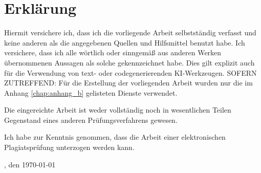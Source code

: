 \section*{Erklärung}
\vspace*{0.5cm}
\noindent
Hiermit versichere ich, dass ich die vorliegende Arbeit selbstständig verfasst und keine anderen als die angegebenen Quellen und Hilfsmittel benutzt habe. Ich versichere, dass ich alle wörtlich oder sinngemäß aus anderen Werken übernommenen Aussagen als solche gekennzeichnet habe. Dies gilt explizit auch für die Verwendung von text- oder codegenerierenden KI-Werkzeugen. SOFERN ZUTREFFEND: Für die Erstellung der vorliegenden Arbeit wurden nur die im Anhang \ref{chap:anhang_b} gelisteten  Dienste verwendet.


Die eingereichte Arbeit ist weder vollständig noch in wesentlichen Teilen Gegenstand eines anderen Prüfungsverfahrens gewesen.

Ich habe zur Kenntnis genommen, dass die Arbeit einer elektronischen Plagiatsprüfung unterzogen werden kann.

\vspace{3cm}
\toponym, den \today